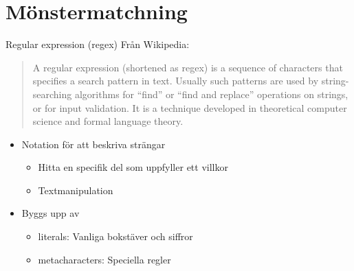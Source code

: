 \documentclass[
  11pt,
  ignorenonframetext,
  handout]{beamer}
\providecommand{\tightlist}{%
  \setlength{\itemsep}{0pt}\setlength{\parskip}{0pt}}
\begin{document}
\hypertarget{muxf6nstermatchning}{%
\section{Mönstermatchning}\label{muxf6nstermatchning}}


\begin{frame}{Regular expression (regex)}
\protect\hypertarget{regular-expression-regex}{}
Från Wikipedia:

\begin{quote}
A regular expression (shortened as regex) is a sequence of characters
that specifies a search pattern in text. Usually such patterns are used
by string-searching algorithms for ``find'' or ``find and replace''
operations on strings, or for input validation. It is a technique
developed in theoretical computer science and formal language theory.
\end{quote}

\begin{itemize}
\tightlist
\item
  Notation för att beskriva strängar

  \begin{itemize}
  \tightlist
  \item
    Hitta en specifik del som uppfyller ett villkor
  \item
    Textmanipulation
  \end{itemize}
\item
  Byggs upp av

  \begin{itemize}
  \tightlist
  \item
    literals: Vanliga bokstäver och siffror
  \item
    metacharacters: Speciella regler
  \end{itemize}
\end{itemize}
\end{frame}

\end{document}
